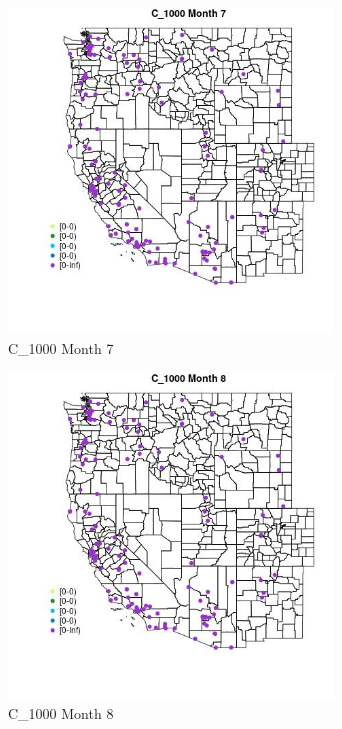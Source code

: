 \begin{figure} 
\centering  
\includegraphics[width=0.77\textwidth]{Code_Outputs/Report_ML_input_PM25_Step4_part_e_de_duplicated_aves_MapObsMo7C_1000.jpg} 
\caption{\label{fig:Report_ML_input_PM25_Step4_part_e_de_duplicated_avesMapObsMo7C_1000}C_1000 Month 7} 
\end{figure} 
 

\clearpage 

\begin{figure} 
\centering  
\includegraphics[width=0.77\textwidth]{Code_Outputs/Report_ML_input_PM25_Step4_part_e_de_duplicated_aves_MapObsMo8C_1000.jpg} 
\caption{\label{fig:Report_ML_input_PM25_Step4_part_e_de_duplicated_avesMapObsMo8C_1000}C_1000 Month 8} 
\end{figure} 
 

